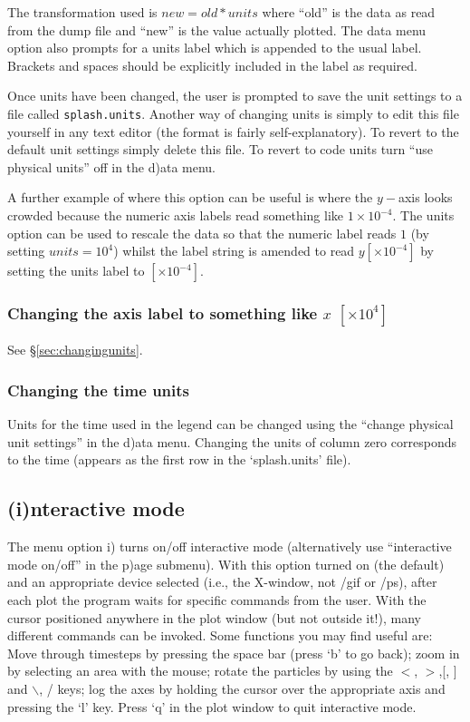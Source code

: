 \documentclass[a4paper,10pt]{article}
\begin{document}
 The transformation used is $new= old*units$ where ``old'' is the data as read from the dump file and ``new'' is the value actually plotted. The data menu option also prompts for a units label which is appended to the usual label. Brackets and spaces should be explicitly included in the label as required.
 
  Once units have been changed, the user is prompted to save the unit settings to a file called \verb+splash.units+. Another way of changing units is simply to edit this file yourself in any text editor (the format is fairly self-explanatory). To revert to the default unit settings simply delete this file. To revert to code units turn ``use physical units'' off in the d)ata menu.
 
 A further example of where this option can be useful is where the $y-$axis looks crowded because the numeric axis labels read something
like $1\times 10^{-4}$. The units option can be used to rescale the data so
that the numeric label reads $1$ (by setting $units=10^{4}$) whilst the label string is amended to read $y
[\times 10^{-4}]$ by setting the units label to $ [ \times 10^{-4}]$.

\subsubsection{ Changing the axis label to something like $x$ $[ \times 10^{4} ]$}
See \S\ref{sec:changingunits}.

\subsubsection{ Changing the time units}
\label{sec:timeunits}
Units for the time used in the legend can be changed using the ``change physical unit settings'' in the d)ata menu. Changing the units of column zero corresponds to the time (appears as the first row in the `splash.units' file). 

\subsection{(i)nteractive mode}
\label{sec:interactive}
 The menu option i) turns on/off interactive mode (alternatively use ``interactive mode on/off'' in the p)age submenu). With this option turned on (the default) and
an appropriate device selected (i.e., the X-window, not /gif or /ps), after
each plot the program waits for specific commands from the user. With the cursor
positioned anywhere in the plot window (but not outside it!), many different
commands can be invoked. Some functions you may find useful are: Move through timesteps by pressing the space bar (press
 `b' to go back); zoom in by selecting an area with the mouse; rotate the
particles by using the $<$, $>$,[, ] and $\backslash$, / keys; log the axes by holding the cursor
over the appropriate axis and pressing the `l' key. Press `q' in the plot window
to quit interactive mode.
\end{document}
